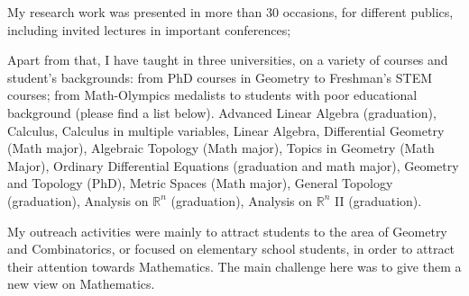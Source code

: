 \documentclass[10pt]{article}
\newenvironment{innerlist}[1][\enskip\textbullet]%
{\begin{compactitem}[#1]}{\end{compactitem}}
\begin{document}
\begin{innerlist}[-]
\item 		My research work was presented in more than 30 occasions, for different publics, including invited lectures in important conferences;

\item Apart from that, 
	I have taught in three universities, on a variety of courses and student's backgrounds: from PhD courses in Geometry to Freshman's STEM courses; from Math-Olympics medalists to students with poor educational background (please find a list below).
	Advanced Linear Algebra (graduation),	Calculus, Calculus in multiple variables, Linear Algebra,  Differential Geometry (Math major), Algebraic Topology (Math major), Topics in Geometry (Math Major), Ordinary Differential Equations (graduation and math major), Geometry and Topology (PhD),	  Metric Spaces (Math major), General Topology (graduation), Analysis on $\mathbb R^n$ (graduation), Analysis on $\mathbb{R}^n$ II (graduation). 
	
	
\item 	My outreach activities were mainly to attract students to the area of Geometry and Combinatorics, or focused on elementary school students, in order to attract their attention towards Mathematics. The main challenge here was to give them a new view on Mathematics.

\end{innerlist}	
	
		
		

	
	
\end{document}
